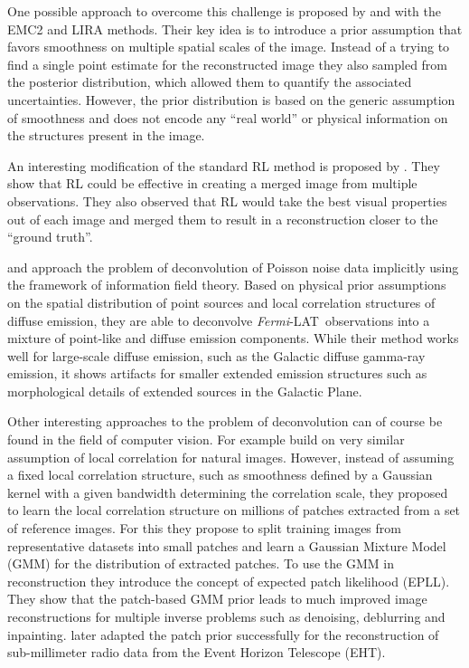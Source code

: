 \documentclass[twocolumn, lineno]{aastex631}
\newcommand{\fermi}{\textit{Fermi}-LAT~}
\begin{document}
    One possible approach to overcome this challenge is proposed by \cite{Esch2004} and \cite{Connors2011} with the EMC2 and LIRA methods. Their key idea is to introduce a prior assumption that favors smoothness on multiple spatial scales of the image. Instead of a trying to find a single point estimate for the reconstructed image they also sampled from the posterior distribution, which allowed them to quantify the associated uncertainties. However, the prior distribution is based on the generic assumption of smoothness and does not encode any \enquote{real world} or physical information on the structures present in the image.

    An interesting modification of the standard RL method is proposed by \cite{Ingaramo2014}. They show that RL could be effective in creating a merged image from multiple observations. They also observed that RL would take the best visual properties out of each image and merged them to result in a reconstruction closer to the \enquote{ground truth}.
    
    \cite{Selig2015} and \cite{Pumpe2018} approach the problem of deconvolution of Poisson noise data implicitly using the framework of information field theory. Based on physical prior assumptions on the spatial distribution of point sources and local correlation structures of diffuse emission, they are able to deconvolve \fermi observations
    into a mixture of point-like and diffuse emission components. While their method works well for large-scale diffuse emission, such as the Galactic diffuse gamma-ray emission, it shows artifacts for smaller extended emission structures such as morphological details of extended sources in the Galactic Plane.
    
    Other interesting approaches to the problem of deconvolution can of course be found in the field of computer vision. For example \cite{Zoran2011} build on very similar assumption of local correlation for natural images. However, instead of assuming a fixed local correlation structure, such as smoothness defined by a Gaussian kernel with a given bandwidth determining the correlation scale, they proposed to learn the local correlation structure on millions of patches extracted from a set of reference images. For this they propose to split training images from representative datasets into small patches and learn a  Gaussian Mixture Model (GMM) for the distribution of extracted patches. To use the GMM in reconstruction they introduce the concept of expected patch likelihood (EPLL). They show that the patch-based GMM prior leads to much improved image reconstructions for multiple inverse problems such as denoising, deblurring and inpainting. \cite{Bouman2016} later adapted the patch prior successfully for the reconstruction of sub-millimeter radio data from the Event Horizon Telescope (EHT).
    
\end{document}
